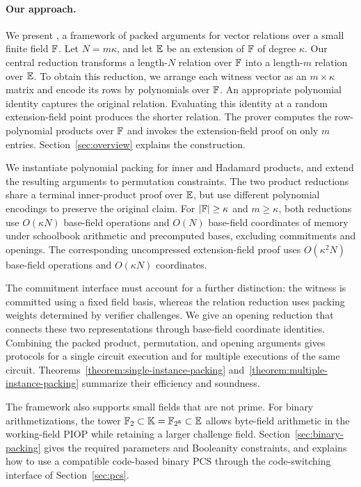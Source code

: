 \paragraph{Our approach.}
We present \methodname, a framework of packed arguments for vector
relations over a small finite field \({\mathbb{F}}\).
Let \(N=m\kappa\), and let \(\mathbb{E}\) be an extension of
\({\mathbb{F}}\) of degree \(\kappa\).
Our central reduction transforms a length-\(N\) relation over
\({\mathbb{F}}\) into a length-\(m\) relation over \(\mathbb{E}\).
To obtain this reduction, we arrange each witness vector as an
\(m\times\kappa\) matrix and encode its rows by polynomials over
\({\mathbb{F}}\). An appropriate polynomial identity captures the
original relation. Evaluating this identity at a random
extension-field point produces the shorter relation.
The prover computes the row-polynomial products over \({\mathbb{F}}\)
and invokes the extension-field proof on only \(m\) entries.
Section~\ref{sec:overview} explains the construction.

We instantiate polynomial packing for inner and Hadamard products,
and extend the resulting arguments to permutation constraints.
The two product reductions share a terminal inner-product proof
over \(\mathbb{E}\), but use different polynomial encodings
to preserve the original claim.
For \(|{\mathbb{F}}|\geq\kappa\) and \(m\geq\kappa\), both reductions
use \(O(\kappa N)\) base-field operations and \(O(N)\) base-field
coordinates of memory under schoolbook arithmetic and precomputed
bases, excluding commitments and openings.
The corresponding uncompressed extension-field proof uses
\(O(\kappa^2N)\) base-field operations and \(O(\kappa N)\)
coordinates.

The commitment interface must account for a further distinction:
the witness is committed using a fixed field basis, whereas the
relation reduction uses packing weights determined by verifier
challenges. We give an opening reduction that connects these two
representations through base-field coordinate identities.
Combining the packed product, permutation, and opening arguments
gives protocols for a single circuit execution and for multiple
executions of the same circuit.
Theorems~\ref{theorem:single-instance-packing}
and~\ref{theorem:multiple-instance-packing} summarize their
efficiency and soundness.

The framework also supports small fields that are not prime.
For binary arithmetizations, the tower
\(\mathbb F_2\subset\mathbb K=\mathbb F_{2^8}\subset\mathbb{E}\)
allows byte-field arithmetic in the working-field PIOP while
retaining a larger challenge field.
Section~\ref{sec:binary-packing} gives the required parameters and
Booleanity constraints, and explains how to use a compatible
code-based binary PCS through the code-switching interface of
Section~\ref{sec:pcs}.

